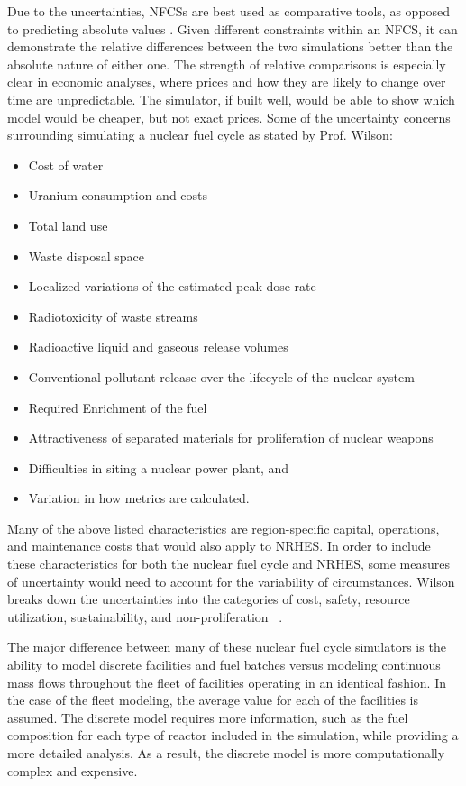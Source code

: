 \documentclass[12pt]{UIdahoMastersThesis}
\begin{document}
Due to the uncertainties, NFCSs are best used as comparative tools, as opposed to predicting absolute values \cite{Wilson2012}. Given different constraints within an NFCS, it can demonstrate the relative differences between the two simulations better than the absolute nature of either one. The strength of relative comparisons is especially clear in economic analyses, where prices and how they are likely to change over time are unpredictable. The simulator, if built well, would be able to show which model would be cheaper, but not exact prices\cite{Wilson2012}. Some of the uncertainty concerns surrounding simulating a nuclear fuel cycle as stated by Prof. Wilson:

\begin{itemize}
\item Cost of water
\item Uranium consumption and costs
\item Total land use
\item Waste disposal space
\item Localized variations of the estimated peak dose rate
\item Radiotoxicity of waste streams
\item Radioactive liquid and gaseous release volumes
\item Conventional pollutant release over the lifecycle of the nuclear system
\item Required Enrichment of the fuel
\item Attractiveness of separated materials for proliferation of nuclear weapons
\item Difficulties in siting a nuclear power plant, and
\item Variation in how metrics are calculated.
\end{itemize}

Many of the above listed characteristics are region-specific capital, operations, and maintenance costs that would also apply to NRHES.  In order to include these characteristics for both the nuclear fuel cycle and NRHES, some measures of uncertainty would need to account for the variability of circumstances. Wilson breaks down the uncertainties into the categories of cost, safety, resource utilization, sustainability, and non-proliferation ~\cite {Wilson2012}.

The major difference between many of these nuclear fuel cycle simulators is the ability to model discrete facilities and fuel batches versus modeling continuous mass flows throughout the fleet of facilities operating in an identical fashion. In the case of the fleet modeling, the average value for each of the facilities is assumed. The discrete model requires more information, such as the fuel composition for each type of reactor included in the simulation, while providing a more detailed analysis. As a result, the discrete model is more computationally complex and expensive.
\end{document}
